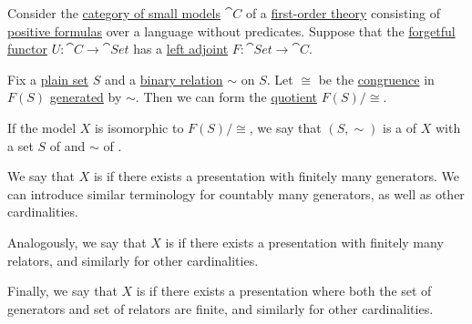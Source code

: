 \begin{definition}\label{def:object_presentation}\mimprovised
  Consider the \hyperref[def:category_of_small_first_order_models]{category of small models} \( \cat{C} \) of a \hyperref[def:first_order_theory]{first-order theory} consisting of \hyperref[def:positive_formula]{positive formulas} over a language without predicates. Suppose that the \hyperref[def:concrete_category]{forgetful functor} \( U: \cat{C} \to \cat{Set} \) has a \hyperref[def:category_adjunction]{left adjoint} \( F: \cat{Set} \to \cat{C} \).

  Fix a \hyperref[def:set]{plain set} \( S \) and a \hyperref[def:binary_relation]{binary relation} \( {\sim} \) on \( S \). Let \( {\cong} \) be the \hyperref[def:first_order_congruence]{congruence} in \( F(S) \) \hyperref[def:first_order_generated_congruence]{generated} by \( {\sim} \). Then we can form the \hyperref[def:first_order_quotient]{quotient} \( F(S) / {\cong} \).

  If the model \( X \) is isomorphic to \( F(S) / {\cong} \), we say that \( (S, {\sim}) \) is a  of \( X \) with a set \( S \) of  and \( {\sim} \) of .

  \begin{thmenum}
     We say that \( X \) is  if there exists a presentation with finitely many generators. We can introduce similar terminology for countably many generators, as well as other cardinalities.

     Analogously, we say that \( X \) is  if there exists a presentation with finitely many relators, and similarly for other cardinalities.

     Finally, we say that \( X \) is  if there exists a presentation where both the set of generators and set of relators are finite, and similarly for other cardinalities.
  \end{thmenum}
\end{definition}

